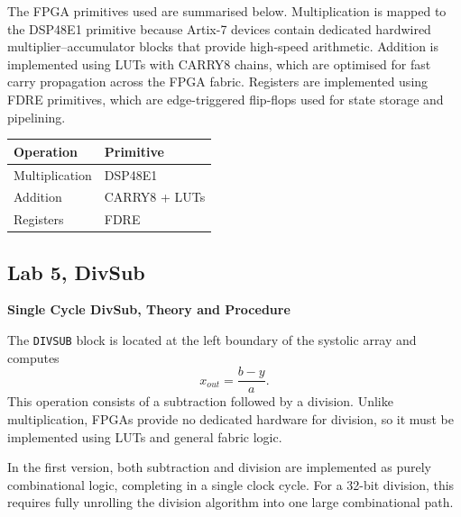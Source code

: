 \documentclass[a4paper,12pt]{article}
\begin{document}
The FPGA primitives used are summarised below. Multiplication is mapped to the DSP48E1 primitive because Artix-7 devices contain dedicated hardwired multiplier--accumulator blocks that provide high-speed arithmetic. Addition is implemented using LUTs with CARRY8 chains, which are optimised for fast carry propagation across the FPGA fabric. Registers are implemented using FDRE primitives, which are edge-triggered flip-flops used for state storage and pipelining.

\begin{table}[h]
\centering
\begin{tabular}{l l}
\hline
\textbf{Operation} & \textbf{Primitive} \\
\hline
Multiplication & DSP48E1 \\
Addition & CARRY8 + LUTs \\
Registers & FDRE \\
\hline
\end{tabular}
\end{table}

\subsection{Lab 5, DivSub}

\textbf{Single Cycle DivSub, Theory and Procedure}

The \texttt{DIVSUB} block is located at the left boundary of the systolic array and computes
\begin{equation}
x_{out} = \frac{b - y}{a}.
\end{equation}
This operation consists of a subtraction followed by a division. Unlike multiplication, FPGAs provide no dedicated hardware for division, so it must be implemented using LUTs and general fabric logic.

In the first version, both subtraction and division are implemented as purely combinational logic, completing in a single clock cycle. For a 32-bit division, this requires fully unrolling the division algorithm into one large combinational path.
\end{document}
